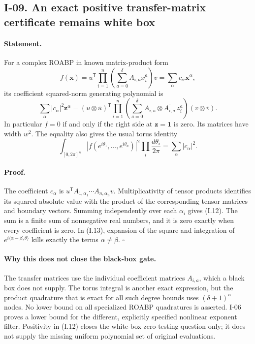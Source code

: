 \documentclass[11pt,a4paper]{article}
\theoremstyle{definition}\newtheorem{definition}{Definition}
\begin{document}
\subsection{I-09. An exact positive transfer-matrix certificate remains white box}
\label{I-09}

\paragraph{Statement.}
For a complex ROABP in known matrix-product form
\[
 f(\mathbf x)=u^{\mathsf T}\prod_{i=1}^n
                  \left(\sum_{a=0}^{\delta}A_{i,a}x_i^a\right)v
             =\sum_{\alpha}c_{\alpha}\mathbf x^{\alpha},
\]
its coefficient squared-norm generating polynomial is
\[
 \sum_{\alpha}|c_\alpha|^2\mathbf z^\alpha
 = (u\otimes\bar u)^{\mathsf T}
     \prod_{i=1}^n\left(\sum_{a=0}^{\delta}
                    A_{i,a}\otimes\overline{A_{i,a}}\,z_i^a\right)
                     (v\otimes\bar v).
\tag{I.12}
\]
In particular $f=0$ if and only if the right side at
$\mathbf z=\mathbf1$ is zero.  Its matrices have width $w^2$.
The equality also gives the usual torus identity
\[
 \int_{[0,2\pi]^n}|f(e^{i\theta_1},\ldots,e^{i\theta_n})|^2
                \prod_i\frac{d\theta_i}{2\pi}
       =\sum_\alpha|c_\alpha|^2.
\tag{I.13}
\]

\paragraph{Proof.}
The coefficient $c_\alpha$ is
$u^{\mathsf T}A_{1,\alpha_1}\cdots A_{n,\alpha_n}v$.
Multiplicativity of tensor products identifies its squared
absolute value with the product of the corresponding tensor
matrices and boundary vectors.  Summing independently over each
$\alpha_i$ gives (I.12).  The sum is a finite sum of nonnegative
real numbers, and it is zero exactly when every coefficient is
zero.  In (I.13), expansion of the square and integration of
$e^{i\langle\alpha-\beta,\theta\rangle}$ kills exactly the terms
$\alpha\ne\beta$. \hfill$\square$

\paragraph{Why this does not close the black-box gate.}
The transfer matrices use the individual coefficient matrices
$A_{i,a}$, which a black box does not supply.  The torus integral
is another exact expression, but the product quadrature that is
exact for all such degree bounds uses $(\delta+1)^n$ nodes.
No lower bound on all specialized ROABP quadratures is asserted.
I-06 proves a lower bound for the different, explicitly specified
nonlinear exponent filter.  Positivity in (I.12) closes the
white-box zero-testing question only; it does not supply the
missing uniform polynomial set of original evaluations.
\end{document}
